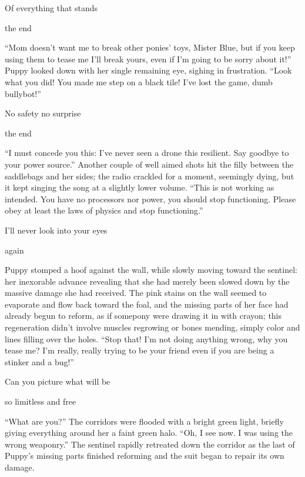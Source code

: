 \begin{song}
Of everything that stands

the end
\end{song}

``Mom doesn't want me to break other ponies' toys, Mister Blue, but if you keep using them to tease me I'll break yours, even if I'm going to be sorry about it!'' Puppy looked down with her single remaining eye, sighing in frustration. ``Look what you did! You made me step on a black tile! I've lost the game, dumb bullybot!''


\begin{song}
    No safety no surprise

    the end
\end{song}

``I must concede you this: I've never seen a drone this resilient. Say goodbye to your power source.'' Another couple of well aimed shots hit the filly between the saddlebags and her sides; the radio crackled for a moment, seemingly dying, but it kept singing the song at a slightly lower volume. ``This is not working as intended. You have no processors nor power, you should stop functioning. Please obey at least the laws of physics and stop functioning.''


\begin{song}
    I'll never look into your eyes

    again
\end{song}

Puppy stomped a hoof against the wall, while slowly moving toward the sentinel: her inexorable advance revealing that she had merely been slowed down by the massive damage she had received. The pink stains on the wall seemed to evaporate and flow back toward the foal, and the missing parts of her face had already begun to reform, as if somepony were drawing it in with crayon; this regeneration didn't involve muscles regrowing or bones mending, simply color and lines filling over the holes. ``Stop that! I'm not doing anything wrong, why you tease me? I'm really, really trying to be your friend even if you are being a stinker and a bug!''


\begin{song}
Can you picture what will be

so limitless and free
\end{song}

``What are you?'' The corridors were flooded with a bright green light, briefly giving everything around her a faint green halo. ``Oh, I see now. I was using the wrong weaponry.'' The sentinel rapidly retreated down the corridor as the last of Puppy's missing parts finished reforming and the suit began to repair its own damage.


